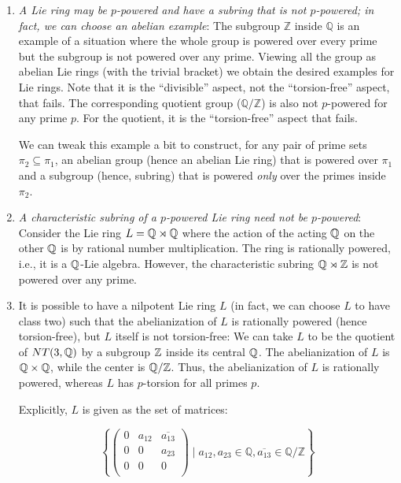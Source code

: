 \begin{enumerate}
\item {\em A Lie ring may be $p$-powered and have a subring that is
  not $p$-powered; in fact, we can choose an abelian example}: The
  subgroup $\mathbb{Z}$ inside $\mathbb{Q}$ is an example of a
  situation where the whole group is powered over every prime but the
  subgroup is not powered over any prime. Viewing all the group as
  abelian Lie rings (with the trivial bracket) we obtain the desired
  examples for Lie rings. Note that it is the ``divisible'' aspect, not
  the ``torsion-free'' aspect, that fails. The corresponding quotient
  group ($\mathbb{Q}/\mathbb{Z}$) is also not $p$-powered for any
  prime $p$. For the quotient, it is the ``torsion-free'' aspect that
  fails.

  We can tweak this example a bit to construct, for any pair of prime
  sets $\pi_2 \subseteq \pi_1$, an abelian group (hence an abelian Lie
  ring) that is powered over $\pi_1$ and a subgroup (hence,
  subring) that is powered {\em only} over the primes inside $\pi_2$.

\item {\em A characteristic subring of a $p$-powered Lie ring need not
  be $p$-powered}: Consider the Lie ring $L = \mathbb{Q} \rtimes \mathbb{Q}$ where the
  action of the acting $\mathbb{Q}$ on the other $\mathbb{Q}$ is by rational number
  multiplication. The ring is rationally powered, i.e., it is a
  $\mathbb{Q}$-Lie algebra. However, the characteristic subring $\mathbb{Q} \rtimes
  \mathbb{Z}$ is not powered over any prime.

\item It is possible to have a nilpotent Lie ring $L$ (in fact, we can
  choose $L$ to have class two) such that the abelianization of $L$ is
  rationally powered (hence torsion-free), but $L$ itself is not
  torsion-free: We can take $L$ to be the quotient of $NT(3,\mathbb{Q})$ by a
  subgroup $\mathbb{Z}$ inside its central $\mathbb{Q}$. The abelianization of $L$ is
  $\mathbb{Q} \times \mathbb{Q}$, while the center is $\mathbb{Q}/\mathbb{Z}$. Thus, the
  abelianization of $L$ is rationally powered, whereas $L$ has
  $p$-torsion for all primes $p$.

  Explicitly, $L$ is given as the set of matrices:

  $$\left \{ \begin{pmatrix} 0 & a_{12} & \overline{a_{13}} \\ 0 & 0 & a_{23} \\ 0 & 0 & 0 \\\end{pmatrix} \mid a_{12},a_{23} \in \mathbb{Q}, \overline{a_{13}} \in \mathbb{Q}/\mathbb{Z} \right \}$$
    

\end{enumerate}
